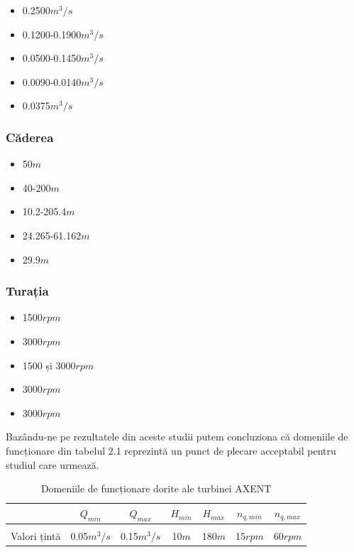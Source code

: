 \begin{itemize}
	\item 0.2500$\si{m^3/s}$ \cite{gentner2000experimentelle}
	\item 0.1200-0.1900$\si{m^3/s}$ \cite{GREES_2014}
	\item 0.0500-0.1450$\si{m^3/s}$ \cite{susanhub}
	\item 0.0090-0.0140$\si{m^3/s}$ \cite{biner2016engineering}
	\item 0.0375$\si{m^3/s}$ \cite{hasmatuchi2014new}
\end{itemize}

\subsubsection{Căderea}

\begin{itemize}
	\item 50$\si{m}$ \cite{gentner2000experimentelle}
	\item 40-200$\si{m}$ \cite{GREES_2014}
	\item 10.2-205.4$\si{m}$ \cite{susanhub}
	\item 24.265-61.162$\si{m}$ \cite{biner2016engineering}
	\item 29.9$\si{m}$ \cite{hasmatuchi2014new}
\end{itemize}


\subsubsection{Turația}

\begin{itemize}
	\item 1500$\si{rpm}$ \cite{gentner2000experimentelle}
	\item 3000$\si{rpm}$ \cite{GREES_2014}
	\item 1500 și 3000$\si{rpm}$ \cite{susanhub}
	\item 3000$\si{rpm}$ \cite{biner2016engineering}
	\item 3000$\si{rpm}$ \cite{hasmatuchi2014new}
\end{itemize}

Bazându-ne pe rezultatele din aceste studii putem concluziona că domeniile de funcționare din tabelul 2.1 reprezintă un punct de plecare acceptabil pentru studiul care urmează.

\begin{table}[ht]
\caption{Domeniile de funcționare dorite ale turbinei AXENT \cite{neipp2017zweistufige}}%
\centering

\begin{tabular}{ c | c | c | c | c | c | c }
           & $Q_{min}$          & $Q_{max}$          & $H_{min}$    & $H_{max}$     & $n_{q,min}$        & $n_{q,max}$ \\ \hline
&&&&&&\\[-0.5em]
Valori țintă  & 0.05$\si{m^3/s}$ & 0.15$\si{m^3/s}$ & 10$\si{m}$ & 180$\si{m}$ & 15$\si{rpm}$ & 60$\si{rpm}$ \\
\end{tabular}

\end{table}


